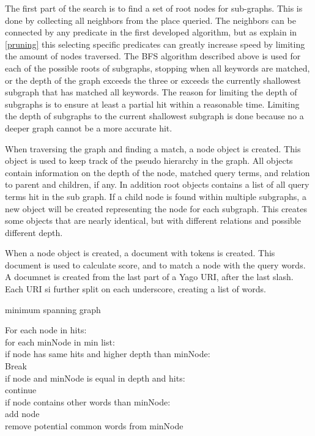 The first part of the search is to find a set of root nodes for sub-graphs. This is done by collecting all neighbors from the place queried. The neighbors can be connected by any predicate in the first developed algorithm, but as explain in \ref{pruning} this selecting specific predicates can greatly increase speed by limiting the amount of nodes traversed. The BFS algorithm described above is used for each of the possible roots of subgraphs, stopping when all keywords are matched, or the depth of the graph exceeds the three or exceeds the currently shallowest subgraph that has matched all keywords. The reason for limiting the depth of subgraphs is to ensure at least a partial hit within a reasonable time. Limiting the depth of subgraphs to the current shallowest subgraph is done because no a deeper graph cannot be a more accurate hit.

When traversing the graph and finding a match, a node object is created. This object is used to keep track of the pseudo hierarchy in the graph. All objects contain information on the depth of the node, matched query terms, and relation to parent and children, if any. In addition root objects contains a list of all query terms hit in the sub graph. If a child node is found within multiple subgraphs, a new object will be created representing the node for each subgraph. This creates some objects that are nearly identical, but with different relations and possible different depth.

When a node object is created, a document with tokens is created. This document is used to calculate score, and to match a node with the query words. A documnet is created from the last part of a Yago URI, after the last slash. Each URI si further split on each underscore, creating a list of words. 

\begin{algorithm}
\caption{minimum spanning graph}
\begin{algorithmic}[1]
For each node in hits:\\
	for each minNode in min list:\\
		if node has same hits and higher depth than minNode:\\
			Break\\
		if node and minNode is equal in depth and hits:\\
			continue\\
		if node contains other words than minNode:\\
			add node\\
			remove potential common words from minNode\\
\EndProcedure
\end{algorithmic}
\end{algorithm}


